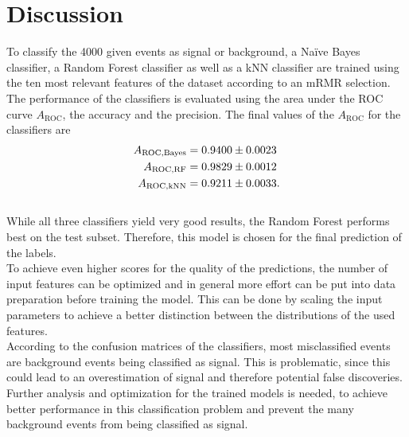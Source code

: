 \section{Discussion}
\label{sec:Discussion}

To classify the 4000 given events as signal or background, a Na\"ive Bayes classifier, a Random Forest classifier as well as a kNN classifier are 
trained using the ten most relevant features of the dataset according to an mRMR selection. The performance of the classifiers is evaluated using
the area under the ROC curve $A_{\mathrm{ROC}}$, the accuracy and the precision. The final values of the $A_{\mathrm{ROC}}$ for the classifiers are
\begin{align*}
    A_{\mathrm{ROC, Bayes}} &= \num{0.9400+-0.0023} \\
    A_{\mathrm{ROC, RF}} &= \num{0.9829(0.0012)} \\
    A_{\mathrm{ROC, kNN}} &= \num{0.9211 \pm 0.0033}.
\end{align*}
\\While all three classifiers yield very good results, the Random Forest performs best on the test subset. Therefore, this model is chosen for the 
final prediction of the labels.\\
To achieve even higher scores for the quality of the predictions, the number of input features can be optimized and in general more
effort can be put into data preparation before training the model. This can be done by scaling the input parameters to achieve a better distinction 
between the distributions of the used features.\\
According to the confusion matrices of the classifiers, most misclassified events are background events being classified as signal. This is
problematic, since this could lead to an overestimation of signal and therefore potential false discoveries.\\
Further analysis and optimization for the trained models is needed, to achieve better performance in this classification problem and prevent
the many background events from being classified as signal.

